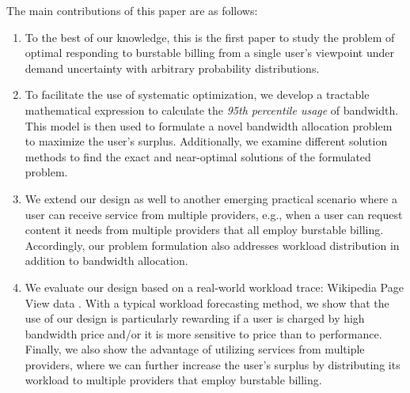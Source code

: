 \documentclass[10pt,journal,compsoc]{IEEEtran}
\begin{document}
The main contributions of this paper are as follows:

\vspace{0.05cm}

\begin{enumerate}
  \item To the best of our knowledge, this is the first paper to study the problem of optimal responding to burstable billing from a single user's viewpoint under demand uncertainty with arbitrary probability distributions. 




\vspace{0.05cm}

  \item To facilitate the use of systematic optimization, we develop a tractable mathematical expression to calculate the \emph{95th percentile usage} of bandwidth. This model is then used to formulate a novel bandwidth allocation problem to maximize the user's surplus.
Additionally, we  examine different solution methods to find the exact and near-optimal solutions of the formulated problem.



\vspace{0.05cm}

  \item We extend our design  as well to  another emerging practical scenario where a user can receive service from multiple  providers, e.g., when a user can request content it needs from multiple providers that all employ burstable billing. Accordingly, our problem formulation also addresses workload distribution in addition to bandwidth allocation.




\vspace{0.05cm}

  \item We evaluate our design based on a real-world workload trace: Wikipedia Page View data \cite{Wikipageview}. With a typical  workload forecasting method, we show that the use of our design is particularly rewarding if a user is charged by high bandwidth price and/or it is more sensitive to price than to performance. Finally, we also show the advantage of utilizing services from multiple providers, where we can further increase the user's surplus by distributing its workload to multiple providers that employ burstable billing.
\end{enumerate}
\end{document}
